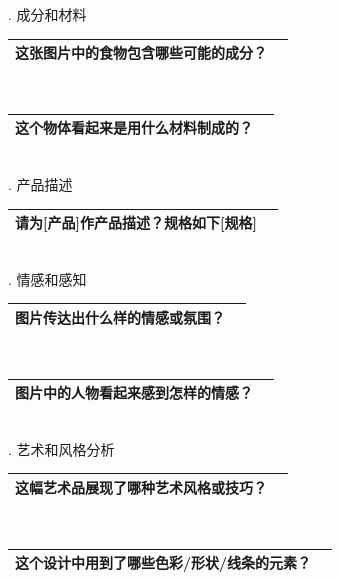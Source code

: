 \documentclass[12pt]{book}
\begin{document}
. 成分和材料

\begin{tabular}{|p{15cm}|p{3cm}|}
	\hline
这张图片中的食物包含哪些可能的成分？\\
	\hline
\end{tabular}\\


\begin{tabular}{|p{15cm}|p{3cm}|}
	\hline
这个物体看起来是用什么材料制成的？\\
	\hline
\end{tabular}\\



. 产品描述

\begin{tabular}{|p{15cm}|p{3cm}|}
	\hline
请为[产品]作产品描述？规格如下[规格]\\
	\hline
\end{tabular}\\



. 情感和感知

\begin{tabular}{|p{15cm}|p{3cm}|}
	\hline
图片传达出什么样的情感或氛围？\\
	\hline
\end{tabular}\\



\begin{tabular}{|p{15cm}|p{3cm}|}
	\hline
图片中的人物看起来感到怎样的情感？\\
	\hline
\end{tabular}\\




. 艺术和风格分析

\begin{tabular}{|p{15cm}|p{3cm}|}
	\hline
这幅艺术品展现了哪种艺术风格或技巧？\\
	\hline
\end{tabular}\\



\begin{tabular}{|p{15cm}|p{3cm}|}
	\hline
这个设计中用到了哪些色彩/形状/线条的元素？\\
	\hline
\end{tabular}\\
\end{document}
